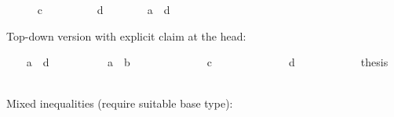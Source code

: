 \begin{isabellebody}
\isanewline
\ \ \isamarkupfalse%
\ {}{}\ {}\ c{}\ \isamarkupfalse%
\isanewline
\ \ \isamarkupfalse%
\isanewline
\ \ \isamarkupfalse%
\ {}{}\ {}\ d{}\ \isamarkupfalse%
\isanewline
\ \ \isamarkupfalse%
\isanewline
\ \ \isamarkupfalse%
\ {}a\ {}\ d{}\ \isamarkupfalse%
%
\begin{isamarkuptxt}%
Top-down version with explicit claim at the head:%
\end{isamarkuptxt}%
\isamarkuptrue%
\ \ \isamarkupfalse%
\ {}a\ {}\ d{}\isanewline
\ \ \isamarkupfalse%
\ {}\isanewline
\ \ \ \ \isamarkupfalse%
\ {}a\ {}\ b{}\ \isamarkupfalse%
\isanewline
\ \ \ \ \isamarkupfalse%
\isanewline
\ \ \ \ \isamarkupfalse%
\ {}{}\ {}\ c{}\ \isamarkupfalse%
\isanewline
\ \ \ \ \isamarkupfalse%
\isanewline
\ \ \ \ \isamarkupfalse%
\ {}{}\ {}\ d{}\ \isamarkupfalse%
\isanewline
\ \ \ \ \isamarkupfalse%
\isanewline
\ \ \ \ \isamarkupfalse%
\ {}thesis\ \isamarkupfalse%
\isanewline
\ \ \isamarkupfalse%
\isanewline
{}\isamarkupfalse%
%
\begin{isamarkuptxt}%
Mixed inequalities (require suitable base type):%
\end{isamarkuptxt}%

\end{isabellebody}
